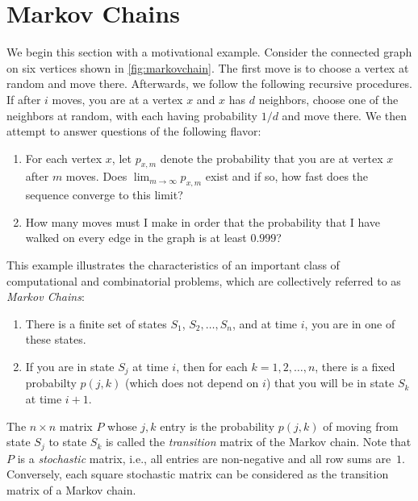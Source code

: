 \section{Markov Chains}\label{s:kitchensink:markov-chains}

We begin this section with a motivational example.
Consider the connected graph on six
vertices shown in \autoref{fig:markovchain}.
The first move is to choose a vertex at random and move
there.  Afterwards, we follow the following recursive
procedures.  If after $i$ moves, 
you are at a vertex $x$
and $x$ has $d$ neighbors, choose one of the neighbors
at random, with each having probability $1/d$ and move there.
We then attempt to answer questions of the following
flavor:

\begin{enumerate}
\item For each vertex $x$, let $p_{x,m}$ denote
the probability that you are at vertex $x$ after $m$
moves.  Does $\lim_{m\rightarrow\infty}p_{x,m}$ exist and
if so, how fast does the sequence converge to this limit?
\item  How many moves must I make in order that the probability
that I have walked on every edge in the graph is at least
$0.999$?
\end{enumerate}

This example illustrates the characteristics of an important class
of computational and combinatorial problems, which are collectively
referred to as \textit{Markov Chains}:  
\begin{enumerate}
\item There is a finite set of states $S_1$, $S_2,\dots,S_n$, and at
time $i$, you are in one of these states.
\item If you are in state $S_j$ at time $i$, then for each
$k=1,2,\dots,n$, there is a fixed probabilty $p(j,k)$ (which does
not depend on $i$) that you will be in state $S_k$ at time $i+1$.
\end{enumerate}

The $n\times n$ matrix $P$ whose $j,k$ entry is the probability $p(j,k)$ 
of moving from state $S_j$ to state $S_k$ is called the \textit{transition}
matrix of the Markov chain.  Note that $P$ is a \textit{stochastic}
matrix, i.e., all entries are non-negative and all row sums are~$1$.
Conversely, each square stochastic matrix can be considered as the transition 
matrix of a Markov chain.

